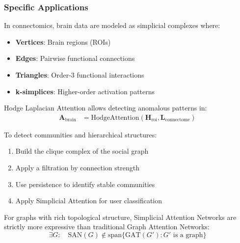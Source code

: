 \subsubsection{Specific Applications}

\begin{application}\label{app:redes_cerebrales}
In connectomics, brain data are modeled as simplicial complexes where:
\begin{itemize}
    \item \textbf{Vertices}: Brain regions (ROIs)
    \item \textbf{Edges}: Pairwise functional connections
    \item \textbf{Triangles}: Order-3 functional interactions
    \item \textbf{k-simplices}: Higher-order activation patterns
\end{itemize}

Hodge Laplacian Attention allows detecting anomalous patterns in:
\begin{align}
    \mathbf{A}_{\text{brain}} &= \text{HodgeAttention}(\mathbf{H}_{\text{roi}}, \mathbf{L}_{\text{connectome}})
\end{align}
\end{application}

\begin{application}\label{app:redes_sociales}
To detect communities and hierarchical structures:
\begin{enumerate}
    \item Build the clique complex of the social graph
    \item Apply a filtration by connection strength
    \item Use persistence to identify stable communities
    \item Apply Simplicial Attention for user classification
\end{enumerate}
\end{application}

\begin{theorem}\label{thm:poder_expresivo_sans}
For graphs with rich topological structure, Simplicial Attention Networks are strictly more expressive than traditional Graph Attention Networks:
\begin{equation}
    \exists G: \quad \text{SAN}(G) \not\in \text{span}\{\text{GAT}(G'): G' \text{ is a graph}\}
\end{equation}
\end{theorem}

